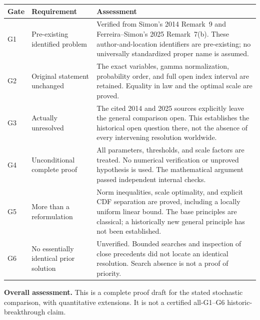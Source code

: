 \documentclass[11pt,a4paper]{article}
\begin{document}
\small
\begin{longtable}{@{}p{}>{\raggedright\arraybackslash}p{}>{\raggedright\arraybackslash}p{}@{}}
\toprule
Gate & Requirement & Assessment\\
\midrule
\endhead
G1 & Pre-existing identified problem &
Verified from Simon's 2014 Remark~9 and Ferreira--Simon's 2025
Remark~7(b). These author-and-location identifiers are pre-existing;
no universally standardized proper name is assumed.\\[5pt]
G2 & Original statement unchanged &
The exact variables, gamma normalization, probability order, and
full open index interval are retained. Equality in law and the
optimal scale are proved.\\[5pt]
G3 & Actually unresolved &
The cited 2014 and 2025 sources explicitly leave the general
comparison open. This establishes the historical open question
there, not the absence of every intervening resolution worldwide.\\[5pt]
G4 & Unconditional complete proof &
All parameters, thresholds, and scale factors are treated.
No numerical verification or unproved hypothesis is used.
The mathematical argument passed independent internal checks.\\[5pt]
G5 & More than a reformulation &
Norm inequalities, scale optimality, and explicit CDF separation
are proved, including a locally uniform linear bound. The base
principles are classical; a historically new general principle
has not been established.\\[5pt]
G6 & No essentially identical prior solution &
Unverified. Bounded searches and inspection of close precedents
did not locate an identical resolution. Search absence is not
a proof of priority.\\
\bottomrule
\end{longtable}
\normalsize
\noindent\textbf{Overall assessment.}
This is a complete proof draft for the stated stochastic comparison,
with quantitative extensions. It is not a certified all-G1--G6
historic-breakthrough claim.
\end{document}
